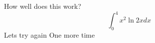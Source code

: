 \documentclass{article}
\begin{document}
How well does this work?
$$\int_0^4 x^2 \ln{2x}dx$$
Lets try again One more time
\end{document}
